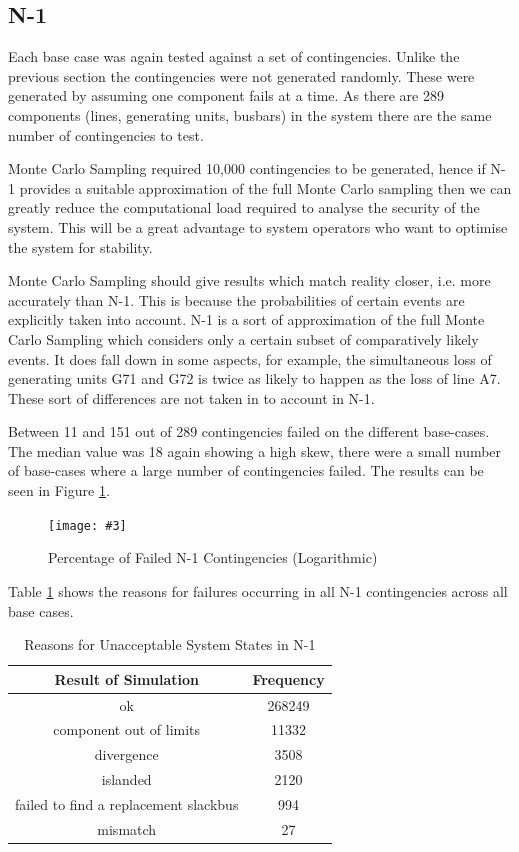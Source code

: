 \documentclass[a4paper,oneside,12pt]{report}
\newcommand{\image}[3] {
  \begin{figure}
    \begin{center}
      \texttt{[image: \#3]}
      \caption{#2}
      \label{#1}
    \end{center}
  \end{figure}
}
\begin{document}
\subsection{N-1}

Each base case was again tested against a set of contingencies. Unlike the previous section the contingencies were not generated randomly. These were generated by assuming one component fails at a time. As there are 289 components (lines, generating units, busbars) in the system there are the same number of contingencies to test. 

Monte Carlo Sampling required 10,000 contingencies to be generated, hence if N-1 provides a suitable approximation of the full Monte Carlo sampling then we can greatly reduce the computational load required to analyse the security of the system. This will be a great advantage to system operators who want to optimise the system for stability.

Monte Carlo Sampling should give results which match reality closer, i.e. more accurately than N-1. This is because the probabilities of certain events are explicitly taken into account. N-1 is a sort of approximation of the full Monte Carlo Sampling which considers only a certain subset of comparatively likely events. It does fall down in some aspects, for example, the simultaneous loss of generating units G71 and G72 is twice as likely to happen as the loss of line A7. These sort of differences are not taken in to account in N-1. 

Between 11 and 151 out of 289 contingencies failed on the different base-cases. The median value was 18 again showing a high skew, there were a small number of base-cases where a large number of contingencies failed. The results can be seen in Figure \ref{nxlogunacceptable}. 

\image{nxlogunacceptable}{Percentage of Failed N-1 Contingencies (Logarithmic)}{nxlogunacceptable.png}

Table \ref{table_failure_reasons_n1} shows the reasons for failures occurring in all N-1 contingencies across all base cases.

\begin{table}[htbp]
\caption{Reasons for Unacceptable System States in N-1}
\label{table_failure_reasons_n1}
\centering
\begin{tabular}{c||c}
\bfseries Result of Simulation & \bfseries Frequency \\
\hline \hline
ok & 268249 \\ 
component out of limits & 11332 \\ 
divergence & 3508 \\ 
islanded & 2120 \\ 
failed to find a replacement slackbus & 994 \\ 
mismatch & 27 \\ 
\hline
\end{tabular}
\end{table}
\end{document}
